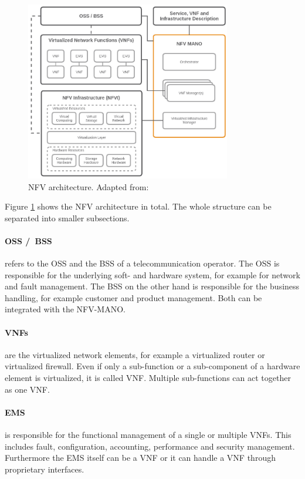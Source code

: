 \begin{figure}[H]
    \centering
    \includegraphics[width=0.8\textwidth]{resources/images/nfv_architecture.png}
    \caption[NFV architecture]{NFV architecture. Adapted from: \autocite{NFV:Architecture}}
    \label{fig:nfv_architecture}
\end{figure}

Figure \ref{fig:nfv_architecture} shows the \ac{NFV} architecture in total.
The whole structure can be separated into smaller subsections.

\paragraph{\acs{OSS} /\ \acs{BSS}} refers to the \ac{OSS} and the \ac{BSS} of a telecommunication operator.\autocite[cf.]{Kahn:2015}
The \ac{OSS} is responsible for the underlying soft- and hardware system, for example for network and fault management.
The \ac{BSS} on the other hand is responsible for the business handling, for example customer and product management.
Both can be integrated with the \ac{NFV-MANO}.\autocite[cf.]{Kahn:2015}

\paragraph{\acp{VNF}} are the virtualized network elements, for example a virtualized router or virtualized firewall.
Even if only a sub-function or a sub-component of a hardware element is virtualized, it is called \ac{VNF}.\autocite[cf.]{Kahn:2015}
Multiple sub-functions can act together as one \ac{VNF}.

\paragraph{\ac{EMS}} is responsible for the functional management of a single or multiple \acp{VNF}.\autocite[cf.]{Kahn:2015}
This includes fault, configuration, accounting, performance and security management.\autocite[cf.]{Kahn:2015}
Furthermore the \ac{EMS} itself can be a \ac{VNF} or it can handle a \ac{VNF} through proprietary interfaces.\autocite[cf.]{Kahn:2015}


